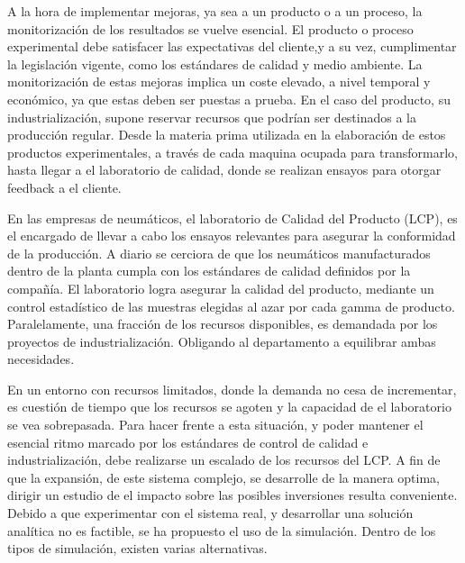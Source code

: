 A la hora de implementar mejoras, ya sea a un producto o a un proceso,
la monitorización de los resultados se vuelve esencial.
El producto o proceso experimental debe satisfacer las expectativas del cliente,y a su vez, cumplimentar la legislación vigente,
como los estándares de calidad y medio ambiente.
La monitorización de estas mejoras implica un coste elevado,
a nivel temporal y económico, ya que estas deben ser puestas a prueba.
En el caso del producto, su industrialización,
supone reservar recursos que podrían ser destinados a la producción regular.
Desde la materia prima utilizada
en la elaboración de estos productos experimentales,
a través de cada maquina ocupada para transformarlo,
hasta llegar a el laboratorio de calidad,
donde se realizan ensayos para otorgar feedback a el cliente.

En las empresas de neumáticos, el laboratorio de Calidad del Producto (LCP),
es el encargado de llevar a cabo los ensayos relevantes
para asegurar la conformidad de la producción.
A diario se cerciora de que los neumáticos manufacturados dentro de la planta
cumpla con los estándares de calidad definidos por la compañía.
El laboratorio logra asegurar la calidad del producto,
mediante un control estadístico de las muestras
elegidas al azar por cada gamma de producto.
Paralelamente, una fracción de los recursos disponibles,
es demandada por los proyectos de industrialización.
Obligando al departamento a equilibrar ambas necesidades.

En un entorno con recursos limitados,
donde la demanda no cesa de incrementar,
es cuestión de tiempo que los recursos se agoten
y la capacidad de el laboratorio se vea sobrepasada.
Para hacer frente a esta situación,
y poder mantener el esencial ritmo
marcado por los estándares de control de calidad e industrialización,
debe realizarse un escalado de los recursos del LCP.
A fin de que la expansión, de este sistema complejo,
se desarrolle de la manera optima,
dirigir  un estudio de el impacto sobre
las posibles inversiones resulta conveniente.
Debido a que experimentar con el sistema real,
y desarrollar una solución analítica no es factible,
se ha propuesto el uso de la simulación.
Dentro de los tipos de simulación, existen varias alternativas.

